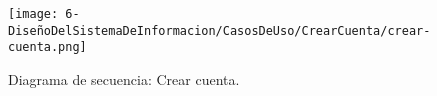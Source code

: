 \begin{figure}[H]
	\centering
	\texttt{[image: 6-DiseñoDelSistemaDeInformacion/CasosDeUso/CrearCuenta/crear-cuenta.png]}
	\caption{Diagrama de secuencia: Crear cuenta.}
\end{figure}